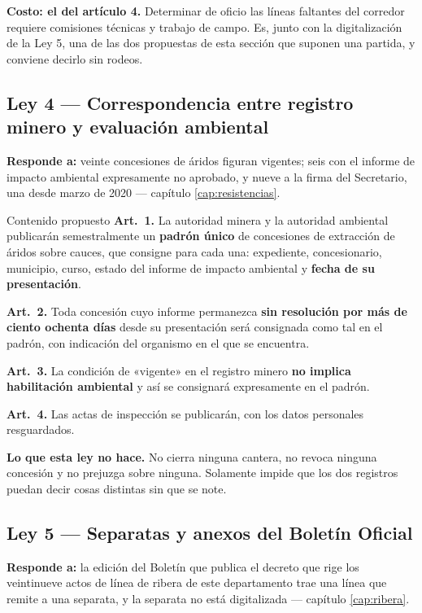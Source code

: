 \textbf{Costo: el del artículo 4.} Determinar de oficio las líneas faltantes del corredor
requiere comisiones técnicas y trabajo de campo. Es, junto con la digitalización de la Ley 5, una de las dos propuestas de esta sección que suponen una partida, y conviene decirlo sin rodeos.

\subsection{Ley 4 --- Correspondencia entre registro minero y evaluación ambiental}

\textbf{Responde a:} veinte concesiones de áridos figuran vigentes; seis con el informe de
impacto ambiental expresamente no aprobado, y nueve a la firma del Secretario, una desde marzo
de 2020 --- capítulo \ref{cap:resistencias}.

\begin{ficha}{Contenido propuesto}
\textbf{Art.\ 1.} La autoridad minera y la autoridad ambiental publicarán semestralmente un
\textbf{padrón único} de concesiones de extracción de áridos sobre cauces, que consigne para
cada una: expediente, concesionario, municipio, curso, estado del informe de impacto ambiental
y \textbf{fecha de su presentación}.

\textbf{Art.\ 2.} Toda concesión cuyo informe permanezca \textbf{sin resolución por más de
ciento ochenta días} desde su presentación será consignada como tal en el padrón, con
indicación del organismo en el que se encuentra.

\textbf{Art.\ 3.} La condición de «vigente» en el registro minero \textbf{no implica
habilitación ambiental} y así se consignará expresamente en el padrón.

\textbf{Art.\ 4.} Las actas de inspección se publicarán, con los datos personales
resguardados.
\end{ficha}

\textbf{Lo que esta ley no hace.} No cierra ninguna cantera, no revoca ninguna concesión y no
prejuzga sobre ninguna. Solamente impide que los dos registros puedan decir cosas distintas
sin que se note.

\subsection{Ley 5 --- Separatas y anexos del Boletín Oficial}

\textbf{Responde a:} la edición del Boletín que publica el decreto que rige los veintinueve actos de línea de ribera de este departamento trae una línea que remite a una separata, y la separata
no está digitalizada --- capítulo \ref{cap:ribera}.

